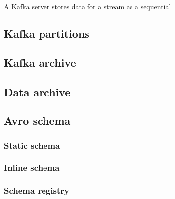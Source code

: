 \documentclass{article}
\newcommand{\kafka} {Kafka\xspace}
\begin{document}
A \kafka server stores data  for a stream as a sequential 



\subsection{Kafka partitions}
\label{kafka-partitions}

\subsection{Kafka  archive}
\label{kafka-archive}

\subsection{Data archive}
\label{kafka-contention}



\subsection{Avro schema}
\label{avro-schema}

\subsubsection{Static schema}
\label{avro-schema.static}

\subsubsection{Inline schema}
\label{avro-schema.inline}

\subsubsection{Schema registry}
\label{avro-schema.registry}
\end{document}
